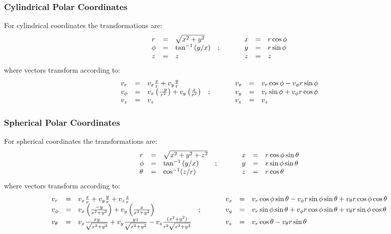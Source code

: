 \documentclass[a4paper,11pt]{article}
\begin{document}
\subsubsection{Cylindrical Polar Coordinates}
For cylindrical coordinates the transformations are:
\begin{displaymath}
\begin{array}{lclp{1cm}lcl}
r & = & \sqrt{x^2 + y^2}    & & x & = & r\cos\phi \\
\phi & = & \tan^{-1}{(y/x)} &; & y & = & r\sin\phi \\
z & = & z                             & & z & = & z\\
\end{array}
\end{displaymath}
where vectors transform according to:
\begin{displaymath}
\begin{array}{lclp{1cm}lcl}
v_r      & = & v_x \frac{x}{r} + v_y \frac{y}{r}  & & v_x & = & v_r \cos\phi - v_\phi r \sin\phi \\
v_\phi & = & v_x \left(\frac{-y}{r^2}\right) + v_y \left(\frac{x}{r^2}\right) &; &v_y & = & v_r \sin\phi + v_\phi r \cos\phi \\
v_z      & = & v_z & & v_z & = & v_z \\
\end{array}
\end{displaymath}

\subsubsection{Spherical Polar Coordinates}
For spherical coordinates the transformations are:
\begin{displaymath}
\begin{array}{lclp{1cm}lcl}
r & = & \sqrt{x^2 + y^2 + z^{2}}    & & x & = & r\cos\phi\sin\theta\\
\phi & = & \tan^{-1}{(y/x)}              &; & y & = & r\sin\phi\sin\theta \\
\theta & = & \cos^{-1}(z/r)             & & z & = & r\cos\theta \\
\end{array}
\end{displaymath}
where vectors transform according to:
\begin{displaymath}
\begin{array}{lclp{1cm}lcl}
v_r      & = & v_x \frac{x}{r} + v_y \frac{y}{r} + v_{z}\frac{z}{r}  & & v_x & = & v_r \cos\phi\sin\theta- v_\phi r \sin\phi\sin\theta + v_\theta r\cos\phi\cos\theta \\
v_\phi & = & v_x \left(\frac{-y}{x^2 + y^{2}}\right) + v_y \left(\frac{x}{x^2 + y^{2}}\right) &; &v_y & = & v_r \sin\phi\sin\theta + v_\phi r \cos\phi\sin\theta + v_{\theta} r\sin\phi\cos\theta \\
v_\theta & = & v_{x}\frac{xy}{\sqrt{x^{2} + y^{2}}} + v_{y}\frac{yz}{\sqrt{x^{2} + y^{2}}} - v_{z}\frac{(x^{2} + y^{2})}{r^{2}\sqrt{x^{2} + y^{2}}}  & & v_z & = & v_r \cos\theta - v_\theta r \sin\theta \\
\end{array}
\end{displaymath}
\end{document}
